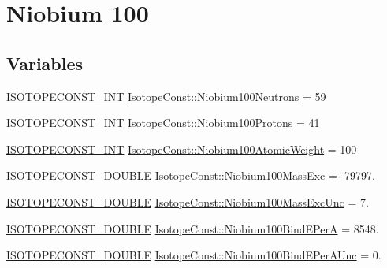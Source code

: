 \hypertarget{group___isotope_const-_niobium-_nb100}{}\section{Niobium 100}
\label{group___isotope_const-_niobium-_nb100}
\subsection*{Variables}
\begin{DoxyCompactItemize}
\item 
\mbox{\hyperlink{group___isotope_const-_macros_ga5f18360b3e99483a35c32d789e62621c}{I\+S\+O\+T\+O\+P\+E\+C\+O\+N\+S\+T\+\_\+\+I\+NT}} \mbox{\hyperlink{group___isotope_const-_niobium-_nb100_gadea850b9ef9d32a05fae867ea3952dc7}{Isotope\+Const\+::\+Niobium100\+Neutrons}} = 59
\item 
\mbox{\hyperlink{group___isotope_const-_macros_ga5f18360b3e99483a35c32d789e62621c}{I\+S\+O\+T\+O\+P\+E\+C\+O\+N\+S\+T\+\_\+\+I\+NT}} \mbox{\hyperlink{group___isotope_const-_niobium-_nb100_ga3f58173c6ca1cf9d66fd851badab0045}{Isotope\+Const\+::\+Niobium100\+Protons}} = 41
\item 
\mbox{\hyperlink{group___isotope_const-_macros_ga5f18360b3e99483a35c32d789e62621c}{I\+S\+O\+T\+O\+P\+E\+C\+O\+N\+S\+T\+\_\+\+I\+NT}} \mbox{\hyperlink{group___isotope_const-_niobium-_nb100_ga28e634979a0fd5de5f8d7331c52a60d4}{Isotope\+Const\+::\+Niobium100\+Atomic\+Weight}} = 100
\item 
\mbox{\hyperlink{group___isotope_const-_macros_ga8f45a7272ce02c0b4c65c44636ed719a}{I\+S\+O\+T\+O\+P\+E\+C\+O\+N\+S\+T\+\_\+\+D\+O\+U\+B\+LE}} \mbox{\hyperlink{group___isotope_const-_niobium-_nb100_gab59a88dc40d7d02b48808904cb242cb8}{Isotope\+Const\+::\+Niobium100\+Mass\+Exc}} = -\/79797.
\item 
\mbox{\hyperlink{group___isotope_const-_macros_ga8f45a7272ce02c0b4c65c44636ed719a}{I\+S\+O\+T\+O\+P\+E\+C\+O\+N\+S\+T\+\_\+\+D\+O\+U\+B\+LE}} \mbox{\hyperlink{group___isotope_const-_niobium-_nb100_ga4f0912a9880defdcc67cbdabfd83627a}{Isotope\+Const\+::\+Niobium100\+Mass\+Exc\+Unc}} = 7.
\item 
\mbox{\hyperlink{group___isotope_const-_macros_ga8f45a7272ce02c0b4c65c44636ed719a}{I\+S\+O\+T\+O\+P\+E\+C\+O\+N\+S\+T\+\_\+\+D\+O\+U\+B\+LE}} \mbox{\hyperlink{group___isotope_const-_niobium-_nb100_ga37ccc4848441c11869b1962ed639e3f0}{Isotope\+Const\+::\+Niobium100\+Bind\+E\+PerA}} = 8548.
\item 
\mbox{\hyperlink{group___isotope_const-_macros_ga8f45a7272ce02c0b4c65c44636ed719a}{I\+S\+O\+T\+O\+P\+E\+C\+O\+N\+S\+T\+\_\+\+D\+O\+U\+B\+LE}} \mbox{\hyperlink{group___isotope_const-_niobium-_nb100_ga33a5ee37bcfedcb79434d5f40e28c431}{Isotope\+Const\+::\+Niobium100\+Bind\+E\+Per\+A\+Unc}} = 0.

\end{DoxyCompactItemize}

